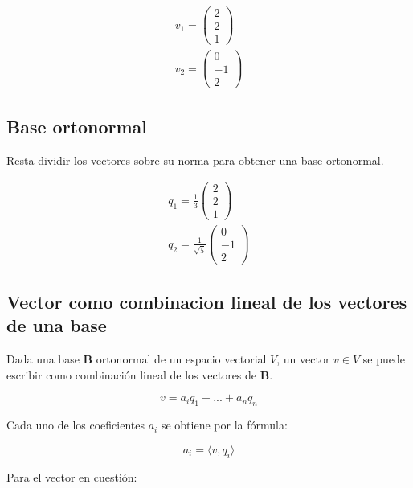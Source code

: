 \documentclass[a4paper,spanish]{article}
\begin{document}
\begin{align*}
    v_1 = \left(\begin{matrix}2 \\2\\1\end{matrix}\right) \\
    v_2 = \left(\begin{matrix}0 \\-1\\2\end{matrix}\right)
\end{align*}

\subsection*{Base ortonormal}
Resta dividir los vectores sobre su norma para obtener una base ortonormal.

\begin{align*}
    q_1 = \frac{1}{3}\left(\begin{matrix}2 \\2\\1\end{matrix}\right) \\
    q_2 = \frac{1}{\sqrt{5}} \left(\begin{matrix}0 \\-1\\2\end{matrix}\right)
\end{align*}

\subsection*{Vector como combinacion lineal de los vectores de una base}
Dada una base $\mathbf{B}$ ortonormal de un espacio vectorial $V$, un vector $v \in V$ se puede escribir como combinación lineal de los vectores de $\mathbf{B}$.

\[
    v = a_iq_1 + ... + a_nq_n
\]

Cada uno  de los coeficientes $a_i$ se obtiene por la fórmula:

\[
    a_i = \langle v, q_i \rangle
\]

Para el vector en cuestión:
\end{document}
